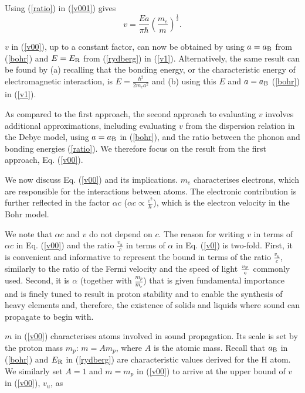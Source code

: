 \documentclass[aps,prl,groupedaddress,fleqn,twocolumn,10pt]{revtex4-1}
\begin{document}
Using (\ref{ratio}) in (\ref{v001}) gives
\begin{equation}
v=\frac{Ea}{\pi\hbar}\left(\frac{m_e}{m}\right)^{\frac{1}{2}}.
\label{v1}
\end{equation}

$v$ in (\ref{v00}), up to a constant factor, can now be obtained by using $a=a_{\rm B}$ from (\ref{bohr}) and $E=E_{\rm R}$ from (\ref{rydberg}) in (\ref{v1}). Alternatively, the same result can be found by (a) recalling that the bonding energy, or the characteristic energy of electromagnetic interaction, is $E=\frac{\hbar^2}{2m_ea^2}$ and (b) using this $E$ and $a=a_{\rm B}$ (\ref{bohr}) in (\ref{v1}).

As compared to the first approach, the second approach to evaluating $v$ involves additional approximations, including evaluating $v$ from the dispersion relation in the Debye model, using $a=a_{\rm B}$ in (\ref{bohr}), and the ratio between the phonon and bonding energies (\ref{ratio}). We therefore focus on the result from the first approach, Eq. (\ref{v00}).

We now discuss Eq. (\ref{v00}) and its implications. $m_e$ characterises electrons, which are responsible for the interactions between atoms. The electronic contribution is further reflected in the factor $\alpha c$ ($\alpha c\propto\frac{e^2}{\hbar}$), which is the electron velocity in the Bohr model.

We note that $\alpha c$ and $v$ do not depend on $c$. The reason for writing $v$ in terms of $\alpha c$ in Eq. (\ref{v00}) and the ratio $\frac{v_u}{c}$ in terms of $\alpha$ in Eq. (\ref{v0}) is two-fold. First, it is convenient and informative to represent the bound in terms of the ratio $\frac{v_u}{c}$, similarly to the ratio of the Fermi velocity and the speed of light $\frac{v_{\rm F}}{c}$ commonly used. Second, it is $\alpha$ (together with $\frac{m_p}{m_e}$) that is given fundamental importance and is finely tuned to result in proton stability and to enable the synthesis of heavy elements \cite{barrow} and, therefore, the existence of solids and liquids where sound can propagate to begin with.

$m$ in (\ref{v00}) characterises atoms involved in sound propagation. Its scale is set by the proton mass $m_p$: $m=Am_p$, where $A$ is the atomic mass. Recall that $a_{\rm B}$ in (\ref{bohr}) and $E_{\rm R}$ in (\ref{rydberg}) are characteristic values derived for the H atom. We similarly set $A=1$ and $m=m_p$ in (\ref{v00}) to arrive at the upper bound of $v$ in (\ref{v00}), $v_u$, as
\end{document}

